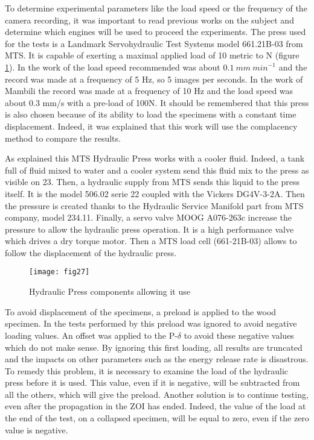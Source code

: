 To determine experimental parameters like the load speed or the frequency of the camera recording, it was important to read previous works on the subject and determine which engines will be used to proceed the experiments. The press used for the tests is a Landmark Servohydraulic Test Systems model 661.21B-03  from MTS. It is capable of exerting a maximal applied load of 10 metric to N (figure \ref{fig:fig27}).
In the work of \cite{Reference11} the load speed recommended was about $0.1\ mm\ {min}^{-1}$ and the record was made at a frequency of 5 Hz, so 5 images per seconds. In the work of Mambili the record was made at a frequency of 10 Hz and the load speed was about 0.3 mm/s with a pre-load of 100N. It should be remembered that this press is also chosen because of its ability to load the specimens with a constant time displacement. Indeed, it was explained that this work will use the complacency method to compare the results.

As explained \cite{Reference10}  this MTS Hydraulic Press works with a cooler fluid. Indeed, a tank full of fluid mixed to water and a cooler system send this fluid mix to the press as visible on 23. Then, a hydraulic supply from MTS sends this liquid to the press itself. It is the model 506.02 serie 22 coupled with the Vickers DG4V-3-2A. Then the pressure is created thanks to the Hydraulic Service Manifold part from MTS company, model 234.11. Finally, a servo valve MOOG A076-263c increase the pressure to allow the hydraulic press operation. It is a high performance valve which drives a dry torque motor. Then a MTS load cell (661-21B-03) allows to follow the displacement of the hydraulic press.

\graphicspath{{Images/}}
\begin{figure}[htp]
	\centering
	\texttt{[image: fig27]}
	\caption{Hydraulic Press components allowing it use}
	\label{fig:fig27}
\end{figure}

To avoid displacement of the specimens, a preload is applied to the wood specimen. In the tests performed by \cite{Reference10} this preload was ignored to avoid negative loading values. An offset was applied to the P-$\delta$ to avoid these negative values which do not make sense. By ignoring this first loading, all results are truncated and the impacts on other parameters such as the energy release rate is disastrous. 
To remedy this problem, it is necessary to examine the load of the hydraulic press before it is used. This value, even if it is negative, will be subtracted from all the others, which will give the preload. Another solution is to continue testing, even after the propagation in the ZOI has ended. Indeed, the value of the load at the end of the test, on a collapsed specimen, will be equal to zero, even if the zero value is negative.

